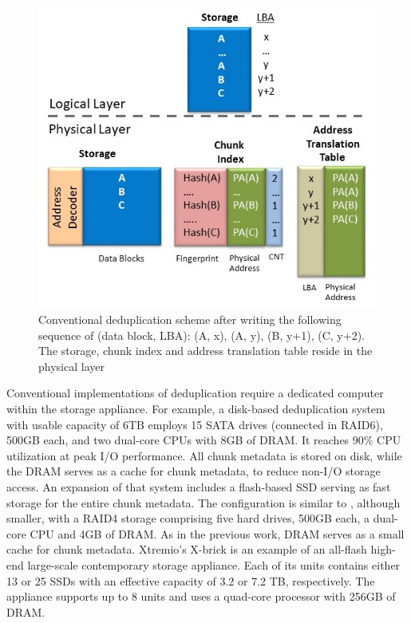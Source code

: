\documentclass{superfri}
\begin{document}
	\begin{figure}[ht!]
		\centerline{\includegraphics[scale=0.5]{Figures/dedup_PC.jpg}}
		\caption{Conventional deduplication scheme after writing the following sequence of (data block, LBA): (A, x), (A, y), (B, y+1), (C, y+2). The storage, chunk index and address translation table reside in the physical layer}
		\label{fig:dedup_PC}
	\end{figure}
	
	Conventional implementations of deduplication require a dedicated computer within the storage appliance. For example, a disk-based deduplication system \cite{zhu2008avoiding} with usable capacity of 6TB employs 15 SATA drives (connected in RAID6), 500GB each, and two dual-core CPUs with 8GB of DRAM. It reaches 90\% CPU utilization at peak I/O performance. All chunk metadata is stored on disk, while the DRAM serves as a cache for chunk metadata, to reduce non-I/O storage access. An expansion of that system \cite{debnath2010chunkstash} includes a flash-based SSD serving as fast storage for the entire chunk metadata. The configuration is similar to \cite{zhu2008avoiding}, although smaller, with a RAID4 storage comprising five hard drives, 500GB each, a dual-core CPU and 4GB of DRAM. As in the previous work, DRAM serves as a small cache for chunk metadata.  Xtremio's X-brick \cite{XbrickSpec} is an example of an all-flash high-end large-scale contemporary storage appliance. Each of its units contains either 13 or 25 SSDs with an effective capacity of 3.2 or 7.2 TB, respectively. The appliance supports up to 8 units and uses a quad-core processor with 256GB of DRAM. 
	
\end{document}
